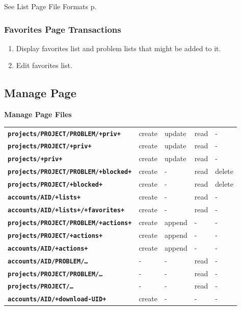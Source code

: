 \documentclass[12pt]{article}
\newenvironment{indpar}[1][0.4in]%
	{\begin{list}{}%
		     {\setlength{\itemsep}{0in}%
		      \setlength{\topsep}{0in}%
		      \setlength{\parsep}{1ex}%
		      \setlength{\labelwidth}{#1}%
		      \setlength{\leftmargin}{#1}%
		      \addtolength{\leftmargin}{\labelsep}}%
	 \item}%
	{\end{list}}
\newcommand{\TT}[1]{{\tt \bfseries #1}}
\newcommand{\pagref}[1]{p\pageref{#1}}
\begin{document}
\begin{indpar}
See List Page File Formats \pagref{LIST-PAGE-FILE-FORMATS}.
\end{indpar}

\subsubsection{Favorites Page Transactions}

\begin{enumerate}
\item Display favorites list and problem lists that might be added to it.
\item Edit favorites list.
\end{enumerate}

\newpage

\subsection{Manage Page}

\begin{center}

{\bf Manage Page Files}

\begin{tabular}{lllll}
\TT{projects/PROJECT/PROBLEM/+priv+}   	& create  & update & read & - \\
\TT{projects/PROJECT/+priv+}    	& create  & update & read & - \\
\TT{projects/+priv+}    		& create  & update & read & - \\
\TT{projects/PROJECT/PROBLEM/+blocked+}	& create  & -      & read & delete \\
\TT{projects/PROJECT/+blocked+}    	& create  & -      & read & delete \\
\TT{accounts/AID/+lists+}    		& create  & -	   & read & - \\
\TT{accounts/AID/+lists+/+favorites+}  	& create  & -	   & read & - \\
\TT{projects/PROJECT/PROBLEM/+actions+} & create  & append & -    & - \\
\TT{projects/PROJECT/+actions+}    	& create  & append & -    & - \\
\TT{accounts/AID/+actions+}    		& create  & append & -    & - \\
\TT{accounts/AID/PROBLEM/\ldots}    	& -	  & -	   & read & - \\
\TT{projects/PROJECT/PROBLEM/\ldots}    & -	  & -	   & read & - \\
\TT{projects/PROJECT/\ldots}    	& -	  & -	   & read & - \\
\TT{accounts/AID/+download-UID+}	& create  & -      & -    & - \\
\end{tabular}


\end{center}
\end{document}
